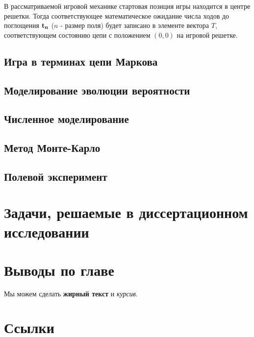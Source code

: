 В рассматриваемой игровой механике стартовая позиция игры находится в центре решетки. 
Тогда соответствующее математическое ожидание числа ходов до поглощения ${\rm \bf t_n}$ ($n$ - размер поля) 
будет записано в элементе вектора $T$, соответствующем состоянию цепи с положением $(0, 0)$ на игровой решетке.

\subsection{Игра в терминах цепи Маркова}\label{subsec:ch1/sec3/sub3}



\subsection{Моделирование эволюции вероятности}\label{subsec:ch1/sec3/sub3}
\subsection{Численное моделирование}\label{subsec:ch1/sec3/sub4}
\subsection{Метод Монте-Карло}\label{subsec:ch1/sec3/sub5}
\subsection{Полевой эксперимент}\label{subsec:ch1/sec3/sub6}

\section{Задачи, решаемые в диссертационном исследовании}\label{sec:ch1/sec4}

\section{Выводы по главе}\label{sec:ch1/sec5}

















Мы можем сделать \textbf{жирный текст} и \textit{курсив}.

\section{Ссылки}\label{sec:ch1/sec2}

